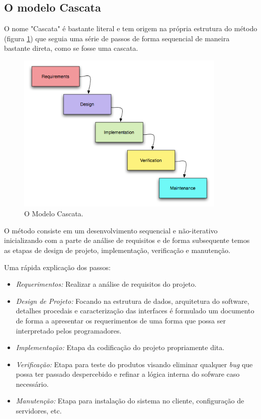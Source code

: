 \subsection{O modelo Cascata}
    \par O nome "Cascata" é bastante literal e tem origem na própria estrutura do método (figura \ref{fig:waterfall}) que seguia uma série de passos de forma sequencial de maneira bastante direta, como se fosse uma cascata.
\begin{figure}[htb]
\centering
\includegraphics[width=10cm]{figuras/waterfall}
\caption{\label{fig:waterfall}O Modelo Cascata.}
\end{figure}
\par O método consiste em um desenvolvimento sequencial e não-iterativo inicializando com a parte de análise de requisitos e de forma subsequente temos as etapas de design de projeto, implementação, verificação e manutenção.

Uma rápida explicação dos passos:
\begin{itemize}
\item \emph{ Requerimentos:} Realizar a análise de requisitos do projeto.
\item \emph{ Design de Projeto:}  Focando na estrutura de dados, arquitetura do software, detalhes procedais e caracterização das interfaces é formulado um documento de forma a apresentar os requerimentos de uma forma que possa ser interpretado pelos programadores.
\item \emph{ Implementação:} Etapa da codificação do projeto propriamente dita.
\item \emph{  Verificação: } Etapa para teste do produtos visando eliminar qualquer \emph{bug} que possa ter passado despercebido e refinar a lógica interna do sofware caso necessário.
\item \emph{ Manutenção: } Etapa para instalação do sistema no cliente, configuração de servidores, etc.
\end{itemize}

